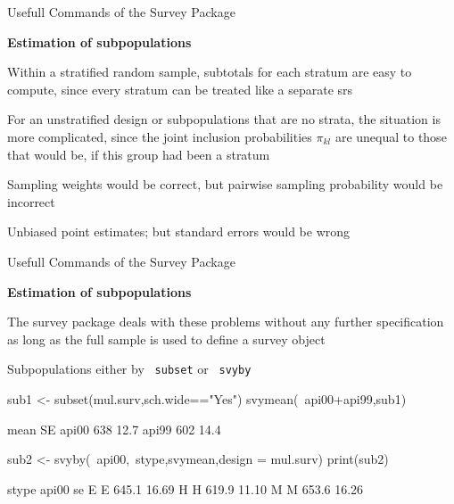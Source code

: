 \documentclass[11pt,german,hideothersubsections]{beamer}
\newcommand{\R}[1]{{\tt \color{blue}  #1}}
\begin{document}
\begin{frame}[fragile]{Usefull Commands} {of the Survey Package}
\footnotesize{
\begin{center}
\textbf{Estimation of subpopulations}
\end{center}
\begin{itemize}
\footnotesize{
\item Within a stratified random sample, subtotals for each stratum are easy to compute, since every stratum can be treated like a separate srs
\pause\item For an unstratified design or subpopulations that are no strata, the situation is more complicated, since the joint inclusion probabilities $\pi_{kl}$ are unequal to those that would be, if this group had been a stratum
\item Sampling weights would be correct, but pairwise sampling probability would be incorrect
\pause\item[$\Rightarrow$] Unbiased point estimates; but standard errors would be wrong
}
\end{itemize}

}
\end{frame}
\begin{frame}[fragile]{Usefull Commands} {of the Survey Package}
\footnotesize{
\begin{center}
\textbf{Estimation of subpopulations}
\end{center}
\begin{itemize}
\footnotesize{
\item The survey package deals with these problems without any further specification as long as the full sample is used to define a survey object
\item Subpopulations either by \R{subset} or \R{svyby}
}
\end{itemize}
\begin{Schunk}
\begin{Sinput}
 sub1 <- subset(mul.surv,sch.wide=="Yes")
 svymean(~api00+api99,sub1)
\end{Sinput}
\begin{Soutput}
      mean   SE
api00  638 12.7
api99  602 14.4
\end{Soutput}
\begin{Sinput}
 sub2 <- svyby(~api00,~stype,svymean,design = mul.surv)
 print(sub2)
\end{Sinput}
\begin{Soutput}
  stype api00    se
E     E 645.1 16.69
H     H 619.9 11.10
M     M 653.6 16.26
\end{Soutput}
\end{Schunk}

}
\end{frame}
\end{document}
